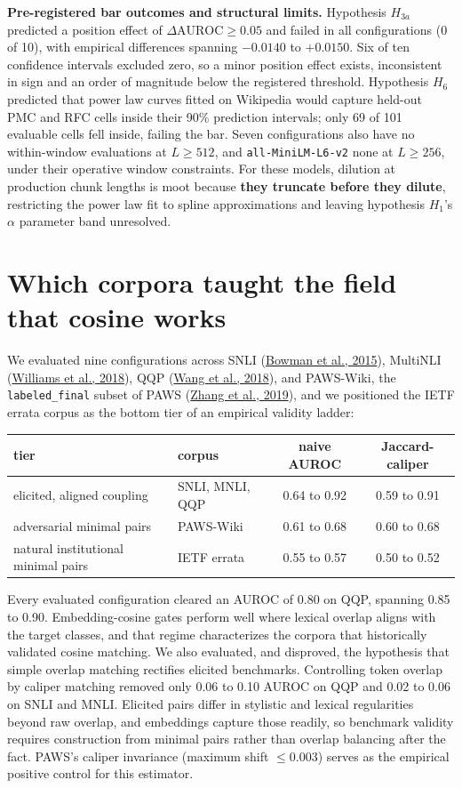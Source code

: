 \documentclass[11pt]{article}
\begin{document}
\textbf{Pre-registered bar outcomes and structural limits.} Hypothesis $H_{3a}$ predicted a position effect of $\Delta \text{AUROC} \ge 0.05$ and failed in all configurations (0 of 10), with empirical differences spanning $-0.0140$ to $+0.0150$. Six of ten confidence intervals excluded zero, so a minor position effect exists, inconsistent in sign and an order of magnitude below the registered threshold. Hypothesis $H_6$ predicted that power law curves fitted on Wikipedia would capture held-out PMC and RFC cells inside their 90\% prediction intervals; only 69 of 101 evaluable cells fell inside, failing the bar. Seven configurations also have no within-window evaluations at $L \ge 512$, and \texttt{all-MiniLM-L6-v2} none at $L \ge 256$, under their operative window constraints. For these models, dilution at production chunk lengths is moot because \textbf{they truncate before they dilute}, restricting the power law fit to spline approximations and leaving hypothesis $H_1$'s $\alpha$ parameter band unresolved.

\section{Which corpora taught the field that cosine works}

We evaluated nine configurations across SNLI (\hyperlink{bib:bowman}{Bowman et al., 2015}), MultiNLI (\hyperlink{bib:williams}{Williams et al., 2018}), QQP (\hyperlink{bib:wangglue}{Wang et al., 2018}), and PAWS-Wiki, the \texttt{labeled\_final} subset of PAWS (\hyperlink{bib:zhang}{Zhang et al., 2019}), and we positioned the IETF errata corpus as the bottom tier of an empirical validity ladder:

\begin{center}
\small
\begin{tabular}{llcc}
\toprule
tier & corpus & naive AUROC & Jaccard-caliper \\
\midrule
elicited, aligned coupling & SNLI, MNLI, QQP & 0.64 to 0.92 & 0.59 to 0.91 \\
adversarial minimal pairs & PAWS-Wiki & 0.61 to 0.68 & 0.60 to 0.68 \\
natural institutional minimal pairs & IETF errata & 0.55 to 0.57 & 0.50 to 0.52 \\
\bottomrule
\end{tabular}
\end{center}

Every evaluated configuration cleared an AUROC of 0.80 on QQP, spanning 0.85 to 0.90. Embedding-cosine gates perform well where lexical overlap aligns with the target classes, and that regime characterizes the corpora that historically validated cosine matching. We also evaluated, and disproved, the hypothesis that simple overlap matching rectifies elicited benchmarks. Controlling token overlap by caliper matching removed only 0.06 to 0.10 AUROC on QQP and 0.02 to 0.06 on SNLI and MNLI. Elicited pairs differ in stylistic and lexical regularities beyond raw overlap, and embeddings capture those readily, so benchmark validity requires construction from minimal pairs rather than overlap balancing after the fact. PAWS's caliper invariance (maximum shift $\le 0.003$) serves as the empirical positive control for this estimator.
\end{document}
